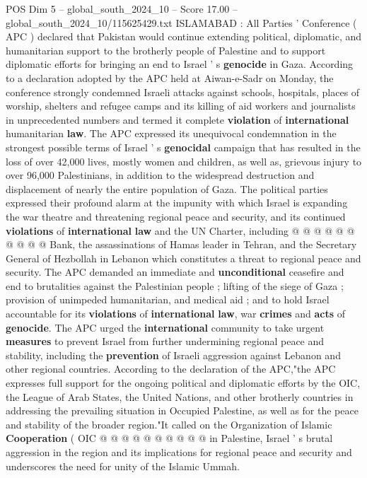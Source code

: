 \begin{textsample}{POS Dim 5 – global\_south\_2024\_10 – Score 17.00 – global\_south\_2024\_10/115625429.txt}  \label{ex:f5_pos_324}
ISLAMABAD : All Parties ' Conference ( APC ) declared that Pakistan would continue extending political, diplomatic, and humanitarian support to the brotherly people of Palestine and to support diplomatic efforts for bringing an end to Israel ' s \textbf{genocide} in Gaza.
According to a declaration adopted by the APC held at Aiwan-e-Sadr on Monday, the conference strongly condemned Israeli attacks against schools, hospitals, places of worship, shelters and refugee camps and its killing of aid workers and journalists in unprecedented numbers and termed it complete \textbf{violation} of \textbf{international} humanitarian \textbf{law}.
The APC expressed its unequivocal condemnation in the strongest possible terms of Israel ' s \textbf{genocidal} campaign that has resulted in the loss of over 42,000 lives, mostly women and children, as well as, grievous injury to over 96,000 Palestinians, in addition to the widespread destruction and displacement of nearly the entire population of Gaza.
The political parties expressed their profound alarm at the impunity with which Israel is expanding the war theatre and threatening regional peace and security, and its continued \textbf{violations} of \textbf{international} \textbf{law} and the UN Charter, including @ @ @ @ @ @ @ @ @ @ Bank, the assassinations of Hamas leader in Tehran, and the Secretary General of Hezbollah in Lebanon which constitutes a threat to regional peace and security.
The APC demanded an immediate and \textbf{unconditional} ceasefire and end to brutalities against the Palestinian people ; lifting of the siege of Gaza ; provision of unimpeded humanitarian, and medical aid ; and to hold Israel accountable for its \textbf{violations} of \textbf{international} \textbf{law}, war \textbf{crimes} and \textbf{acts} of \textbf{genocide}.
The APC urged the \textbf{international} community to take urgent \textbf{measures} to prevent Israel from further undermining regional peace and stability, including the \textbf{prevention} of Israeli aggression against Lebanon and other regional countries.
According to the declaration of the APC,"the APC expresses full support for the ongoing political and diplomatic efforts by the OIC, the League of Arab States, the United Nations, and other brotherly countries in addressing the prevailing situation in Occupied Palestine, as well as for the peace and stability of the broader region."It called on the Organization of Islamic \textbf{Cooperation} ( OIC @ @ @ @ @ @ @ @ @ @ in Palestine, Israel ' s brutal aggression in the region and its implications for regional peace and security and underscores the need for unity of the Islamic Ummah.

\end{textsample}

